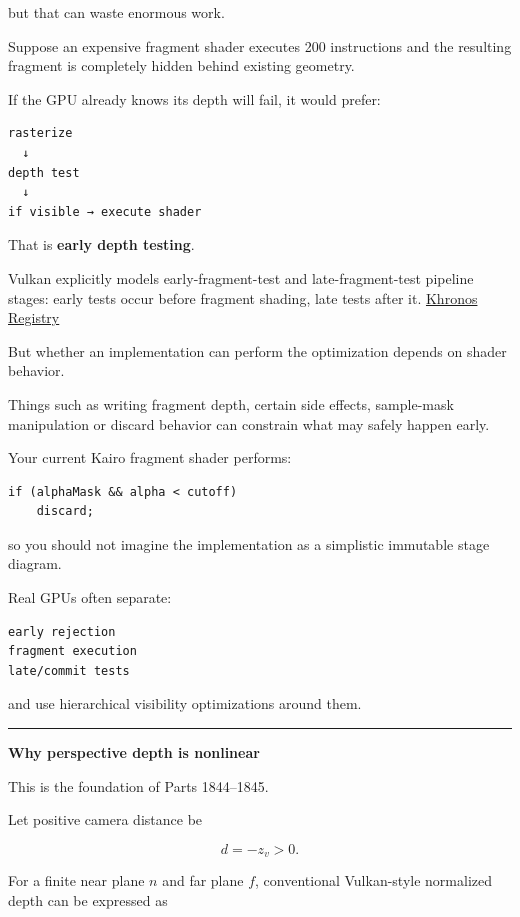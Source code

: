 but that can waste enormous work.

Suppose an expensive fragment shader executes 200 instructions and the resulting fragment is completely hidden behind existing geometry.

If the GPU already knows its depth will fail, it would prefer:

\begin{verbatim}
rasterize
  ↓
depth test
  ↓
if visible → execute shader
\end{verbatim}

That is \textbf{early depth testing}.

Vulkan explicitly models early-fragment-test and late-fragment-test pipeline stages: early tests occur before fragment shading, late tests after it. \href{https://registry.khronos.org/VulkanSC/specs/1.0-extensions/man/html/VkPipelineStageFlagBits2KHR.html?utm_source=chatgpt.com}{Khronos Registry}

But whether an implementation can perform the optimization depends on shader behavior.

Things such as writing fragment depth, certain side effects, sample-mask manipulation or discard behavior can constrain what may safely happen early.

Your current Kairo fragment shader performs:

\begin{verbatim}
if (alphaMask && alpha < cutoff)
    discard;
\end{verbatim}

so you should not imagine the implementation as a simplistic immutable stage diagram.

Real GPUs often separate:

\begin{verbatim}
early rejection
fragment execution
late/commit tests
\end{verbatim}

and use hierarchical visibility optimizations around them.

\begin{center}\rule{0.5\linewidth}{0.5pt}\end{center}

\textbf{Why perspective depth is nonlinear}

This is the foundation of Parts 1844--1845.

Let positive camera distance be

\[
d=-z_v>0.
\]

For a finite near plane \(n\) and far plane \(f\), conventional Vulkan-style normalized depth can be expressed as

